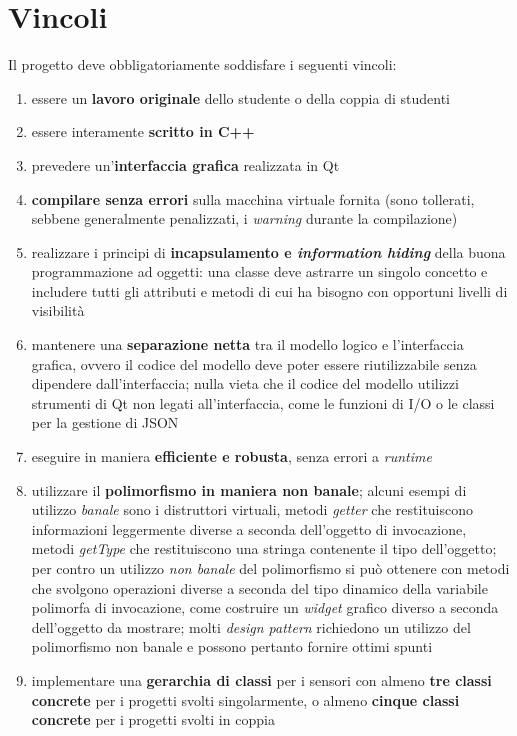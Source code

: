 \documentclass[10pt,a4paper,oneside]{article}
\begin{document}
\section{Vincoli}
Il progetto deve obbligatoriamente soddisfare i seguenti vincoli:
\begin{enumerate}
 \item essere un \textbf{lavoro originale} dello studente o della coppia di studenti
 \item essere interamente \textbf{scritto in C++}
 \item prevedere un'\textbf{interfaccia grafica} realizzata in Qt
 \item \textbf{compilare senza errori} sulla macchina virtuale fornita (sono tollerati, sebbene generalmente penalizzati, i \emph{warning} durante la compilazione)
 \item realizzare i principi di \textbf{incapsulamento e \emph{information hiding}} della buona programmazione ad oggetti: una classe deve astrarre un singolo concetto e includere tutti gli attributi e metodi di cui ha bisogno con opportuni livelli di visibilità
 \item mantenere una \textbf{separazione netta} tra il modello logico e l'interfaccia grafica, ovvero il codice del modello deve poter essere riutilizzabile senza dipendere dall'interfaccia; nulla vieta che il codice del modello utilizzi strumenti di Qt non legati all'interfaccia, come le funzioni di I/O o le classi per la gestione di JSON
 \item eseguire in maniera \textbf{efficiente e robusta}, senza errori a \emph{runtime}
 \item utilizzare il \textbf{polimorfismo in maniera non banale}; alcuni esempi di utilizzo \emph{banale} sono i distruttori virtuali, metodi \emph{getter} che restituiscono informazioni leggermente diverse a seconda dell'oggetto di invocazione, metodi \emph{getType} che restituiscono una stringa contenente il tipo dell'oggetto; per contro un utilizzo \emph{non banale} del polimorfismo si può ottenere con metodi che svolgono operazioni diverse a seconda del tipo dinamico della variabile polimorfa di invocazione, come costruire un \emph{widget} grafico diverso a seconda dell'oggetto da mostrare; molti \emph{design pattern} richiedono un utilizzo del polimorfismo non banale e possono pertanto fornire ottimi spunti
 \item implementare una \textbf{gerarchia di classi} per i sensori con almeno \textbf{tre classi concrete} per i progetti svolti singolarmente, o almeno \textbf{cinque classi concrete} per i progetti svolti in coppia

\end{enumerate}
\end{document}
